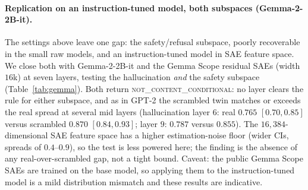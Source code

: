 \paragraph{Replication on an instruction-tuned model, both subspaces (Gemma-2-2B-it).} The
settings above leave one gap: the safety/refusal subspace, poorly recoverable in the small raw
models, and an instruction-tuned model in SAE feature space. We close both with Gemma-2-2B-it and
the Gemma Scope residual SAEs (width $16$k) at seven layers, testing the hallucination
\emph{and} the safety subspace (Table~\ref{tab:gemma}). Both return
\textsc{not\_content\_conditional}: no layer clears the rule for either subspace, and as in GPT-2
the scrambled twin matches or exceeds the real spread at several mid layers (hallucination layer
$6$: real $0.765$ $[0.70,0.85]$ versus scrambled $0.870$ $[0.84,0.93]$; layer $9$: $0.787$ versus
$0.855$). The $16{,}384$-dimensional SAE feature space has a higher estimation-noise floor (wider
CIs, spreads of $0.4$--$0.9$), so the test is less powered here; the finding is the absence of any
real-over-scrambled gap, not a tight bound. Caveat: the public Gemma Scope SAEs are trained on the
base model, so applying them to the instruction-tuned model is a mild distribution mismatch and
these results are indicative.

